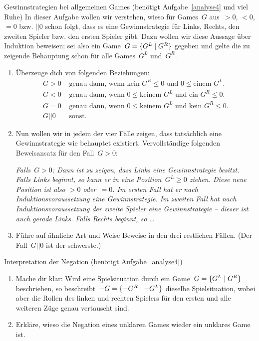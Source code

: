 \documentclass{zirkelblatt}
\newcommand{\fuzzy}{\mathrel{||}}
\begin{document}
\begin{aufgabe}{Gewinnstrategien bei allgemeinen Games (benötigt
Aufgabe~\ref{analyse4} und viel Ruhe)}
\label{gewinnstrategien}
In dieser Aufgabe wollen wir verstehen, wieso für Games~$G$ aus~$> 0$, $<
0$, $= 0$ bzw. $\fuzzy 0$ schon folgt, dass es eine Gewinnstrategie für Links,
Rechts, den zweiten Spieler bzw. den ersten Spieler gibt. Dazu wollen wir diese
Aussage über Induktion beweisen; sei also ein Game~$G = \{ G^L \mathrel{|} G^R \}$
gegeben und gelte die zu zeigende Behauptung schon für alle Games~$G^L$
und~$G^R$.
\begin{enumerate}
\item Überzeuge dich von folgenden Beziehungen:
\begin{align*}
  G > 0 &\text{ genau dann, wenn $\text{kein $G^R$} \leq 0$ und~$0 \leq \text{einem $G^L$}$.} \\
  G < 0 &\text{ genau dann, wenn $0 \leq \text{keinem $G^L$}$ und~$\text{ein $G^R$} \leq 0$.} \\
  G = 0 &\text{ genau dann, wenn $0 \leq \text{keinem $G^L$}$ und~$\text{kein $G^R$} \leq 0$.} \\
  G \fuzzy 0 &\text{ sonst.}
\end{align*}
\item Nun wollen wir in jedem der vier Fälle zeigen, dass tatsächlich eine Gewinnstrategie
wie behauptet existiert. Vervollständige folgenden Beweisansatz für den Fall~$G
> 0$:

\emph{Falls~$G > 0$: Dann ist zu zeigen, dass Links eine
Gewinnstrategie besitzt. Falls Links beginnt, so kann er in eine Position~$G^L
\geq 0$ ziehen. Diese neue Position ist also $> 0$ oder~$= 0$. Im ersten Fall
hat er nach Induktionsvoraussetzung eine Gewinnstrategie. Im zweiten Fall hat
nach Induktionsvoraussetzung der zweite Spieler eine Gewinnstrategie -- dieser
ist auch gerade Links. Falls Rechts beginnt, so \ldots}
\item Führe auf ähnliche Art und Weise Beweise in den drei restlichen Fällen.
(Der Fall~$G \fuzzy 0$ ist der schwerste.)
\end{enumerate}
\end{aufgabe}

\begin{aufgabe}{Interpretation der Negation (benötigt Aufgabe~\ref{analyse4})}
\label{game-negation}
\begin{enumerate}
\item Mache dir klar: Wird eine Spielsituation durch ein Game~$G =
\{ G^L \mathrel{|} G^R \}$ beschrieben,
so beschreibt~$-G = \{ -G^R \mathrel{|} -G^L \}$ dieselbe Spielsituation, wobei aber die Rollen des linken und
rechten Spielers für den ersten und alle weiteren Züge genau vertauscht sind.
\item Erkläre, wieso die Negation
eines unklaren Games wieder ein unklares Game ist.
\end{enumerate}
\end{aufgabe}
\end{document}

